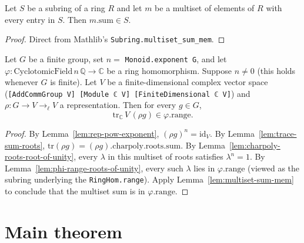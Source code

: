 \begin{lemma}
  \label{lem:multiset-sum-mem}
  \leanok
  Let $S$ be a subring of a ring $R$ and let $m$ be a multiset of elements of $R$ with every entry in $S$.  Then $m.\mathrm{sum} \in S$.
\end{lemma}
\begin{proof}
  Direct from Mathlib's \verb|Subring.multiset_sum_mem|.
\end{proof}

\begin{lemma}
  \label{lem:trace-mem-range}
  \leanok
  Let $G$ be a finite group, set $n = $ \verb|Monoid.exponent G|, and let $\varphi : \mathrm{CyclotomicField}\,n\,\mathbb{Q} \to \mathbb{C}$ be a ring homomorphism.  Suppose $n \neq 0$ (this holds whenever $G$ is finite).  Let $V$ be a finite-dimensional complex vector space (\verb|[AddCommGroup V] [Module ℂ V] [FiniteDimensional ℂ V]|) and $\rho : G \to V \to_{\ell} V$ a representation.  Then for every $g \in G$,
  \[
    \mathrm{tr}_{\mathbb{C}}\,V\,(\rho g) \in \varphi.\mathrm{range}.
  \]
\end{lemma}
\begin{proof}
  By Lemma~\ref{lem:rep-pow-exponent}, $(\rho g)^n = \mathrm{id}_V$.  By Lemma~\ref{lem:trace-sum-roots},
  $\mathrm{tr}(\rho g) = (\rho g).\mathrm{charpoly}.\mathrm{roots}.\mathrm{sum}$.
  By Lemma~\ref{lem:charpoly-roots-root-of-unity}, every $\lambda$ in this multiset of roots satisfies $\lambda^n = 1$.  By Lemma~\ref{lem:phi-range-roots-of-unity}, every such $\lambda$ lies in $\varphi.\mathrm{range}$ (viewed as the subring underlying the \verb|RingHom.range|).  Apply Lemma~\ref{lem:multiset-sum-mem} to conclude that the multiset sum is in $\varphi.\mathrm{range}$.
\end{proof}

\section{Main theorem}

